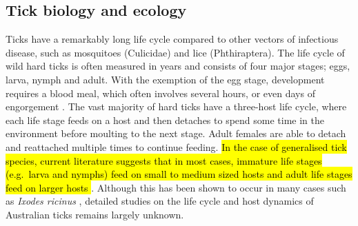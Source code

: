 \documentclass[a4paper, nobind]{templates/ociamthesis}
\begin{document}
\hypertarget{tick-biology-and-ecology}{%
\subsection{Tick biology and ecology}\label{tick-biology-and-ecology}}

Ticks have a remarkably long life cycle compared to other vectors of infectious disease, such as mosquitoes (Culicidae) and lice (Phthiraptera).
The life cycle of wild hard ticks is often measured in years and consists of four major stages; eggs, larva, nymph and adult.
With the exemption of the egg stage, development requires a blood meal, which often involves several hours, or even days of engorgement \autocite{cuppBiologyTicks1991}.
The vast majority of hard ticks have a three-host life cycle, where each life stage feeds on a host and then detaches to spend some time in the environment before moulting to the next stage.
Adult females are able to detach and reattached multiple times to continue feeding.
\hl{In the case of generalised tick species, current literature suggests that in most cases, immature life stages (e.g.~larva and nymphs) feed on small to medium sized hosts and adult life stages feed on larger hosts \autocite{apanaskevichLifeCyclesNatural2014}}.
Although this has been shown to occur in many cases such as \emph{Ixodes ricinus} \autocite{krasnovHostCommunityStructure2007}, detailed studies on the life cycle and host dynamics of Australian ticks remains largely unknown.
\end{document}

